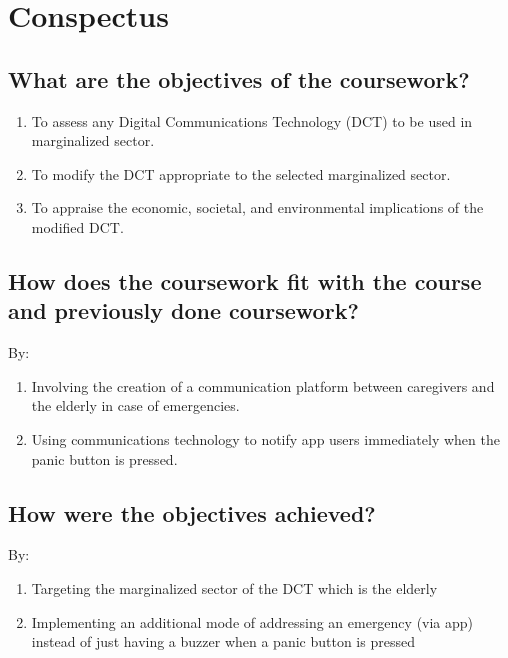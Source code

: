 \section{Conspectus}
\label{sec:cnspcts}

\IEEEpubidadjcol %

\subsection{What are the objectives of the coursework?}
\begin{enumerate}
	\item To assess any Digital Communications Technology (DCT) to be used in marginalized sector.
	\item To modify the DCT appropriate to the selected marginalized sector.
	\item To appraise the economic, societal, and environmental implications of the modified DCT.
\end{enumerate}	

\subsection{How does the coursework fit with the course and previously done coursework?}
By:
\begin{enumerate}
	\item Involving the creation of a communication platform between caregivers and the elderly in case of emergencies.
	\item Using communications technology to notify app users immediately when the panic button is pressed.
\end{enumerate}	

\subsection{How were the objectives achieved?}
By:
\begin{enumerate}
	\item Targeting the marginalized sector of the DCT which is the elderly
	\item Implementing an additional mode of addressing an emergency (via app) instead of just having a buzzer when a panic button is pressed
\end{enumerate}

	
